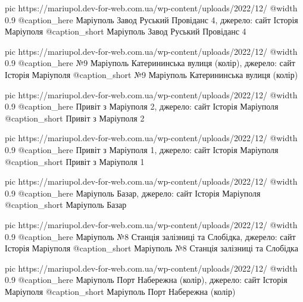 	pic https://mariupol.dev-for-web.com.ua/wp-content/uploads/2022/12/%
	@width 0.9
	@caption_here Маріуполь Завод Руський Провіданс 4, джерело: сайт Історія Маріуполя
	@caption_short Маріуполь Завод Руський Провіданс 4

	pic https://mariupol.dev-for-web.com.ua/wp-content/uploads/2022/12/%
	@width 0.9
	@caption_here №9 Маріуполь Катерининська вулиця (колір), джерело: сайт Історія Маріуполя
	@caption_short №9 Маріуполь Катерининська вулиця (колір)

	pic https://mariupol.dev-for-web.com.ua/wp-content/uploads/2022/12/%
	@width 0.9
	@caption_here Привіт з Маріуполя 2, джерело: сайт Історія Маріуполя
	@caption_short Привіт з Маріуполя 2

	pic https://mariupol.dev-for-web.com.ua/wp-content/uploads/2022/12/%
	@width 0.9
	@caption_here Привіт з Маріуполя 1, джерело: сайт Історія Маріуполя
	@caption_short Привіт з Маріуполя 1

	pic https://mariupol.dev-for-web.com.ua/wp-content/uploads/2022/12/%
	@width 0.9
	@caption_here Маріуполь Базар, джерело: сайт Історія Маріуполя
	@caption_short Маріуполь Базар

	pic https://mariupol.dev-for-web.com.ua/wp-content/uploads/2022/12/%
	@width 0.9
	@caption_here Маріуполь №8 Станція залізниці та Слобідка, джерело: сайт Історія Маріуполя
	@caption_short Маріуполь №8 Станція залізниці та Слобідка

	pic https://mariupol.dev-for-web.com.ua/wp-content/uploads/2022/12/%
	@width 0.9
	@caption_here Маріуполь Порт Набережна (колір), джерело: сайт Історія Маріуполя
	@caption_short Маріуполь Порт Набережна (колір)

